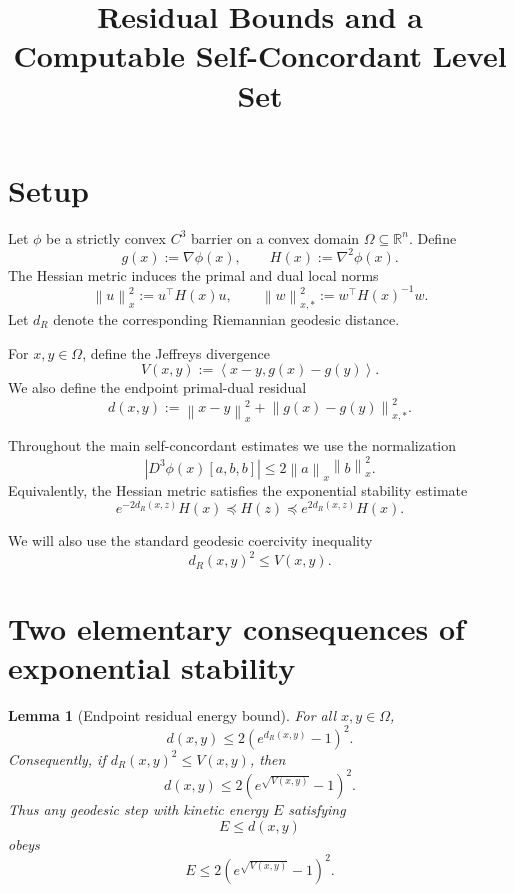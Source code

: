 \documentclass[11pt]{article}
\title{Residual Bounds and a Computable Self-Concordant Level Set}
\author{}
\date{}
\newtheorem{lemma}{Lemma}
\newcommand{\R}{\mathbb R}
\newcommand{\ip}[2]{\left\langle #1,#2\right\rangle}
\newcommand{\norm}[1]{\left\lVert #1\right\rVert}
\begin{document}
\maketitle

\section{Setup}

Let $\phi$ be a strictly convex $C^3$ barrier on a convex domain $\Omega\subseteq\R^n$. Define
\[
    g(x):=\nabla\phi(x),
    \qquad
    H(x):=\nabla^2\phi(x).
\]
The Hessian metric induces the primal and dual local norms
\[
    \norm{u}_x^2:=u^\top H(x)u,
    \qquad
    \norm{w}_{x,*}^2:=w^\top H(x)^{-1}w.
\]
Let $d_R$ denote the corresponding Riemannian geodesic distance.

For $x,y\in\Omega$, define the Jeffreys divergence
\[
    V(x,y):=\ip{x-y}{g(x)-g(y)}.
\]
We also define the endpoint primal-dual residual
\[
    d(x,y)
    :=
    \norm{x-y}_x^2
    +
    \norm{g(x)-g(y)}_{x,*}^2.
\]

Throughout the main self-concordant estimates we use the normalization
\[
    |D^3\phi(x)[a,b,b]|
    \le
    2\norm{a}_x\norm{b}_x^2.
\]
Equivalently, the Hessian metric satisfies the exponential stability estimate
\[
    e^{-2d_R(x,z)}H(x)
    \preceq
    H(z)
    \preceq
    e^{2d_R(x,z)}H(x).
\]

We will also use the standard geodesic coercivity inequality
\[
    d_R(x,y)^2\le V(x,y).
\]

\section{Two elementary consequences of exponential stability}

\begin{lemma}[Endpoint residual energy bound]
\label{lem:Ebound}
For all $x,y\in\Omega$,
\[
    d(x,y)
    \le
    2\left(e^{d_R(x,y)}-1\right)^2.
\]
Consequently, if $d_R(x,y)^2\le V(x,y)$, then
\[
    d(x,y)
    \le
    2\left(e^{\sqrt{V(x,y)}}-1\right)^2.
\]
Thus any geodesic step with kinetic energy $E$ satisfying
\[
    E\le d(x,y)
\]
obeys
\[
    E
    \le
    2\left(e^{\sqrt{V(x,y)}}-1\right)^2.
\]
\end{lemma}
\end{document}
